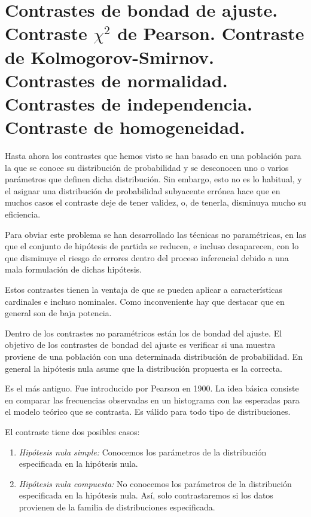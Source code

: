 \chapter[Contrastes de bondad de ajuste.]{Contrastes de bondad de ajuste. \\
\normalsize Contraste $\chi^2$ de Pearson. Contraste de Kolmogorov-Smirnov. Contrastes de normalidad. Contrastes de independencia. Contraste de homogeneidad.}

Hasta ahora los contrastes que hemos visto se han basado en una poblaci\'on para la que se conoce su distribuci\'on de probabilidad y se desconocen uno o varios par\'ametros que definen dicha distribuci\'on. Sin embargo, esto no es lo habitual, y el asignar una distribuci\'on de probabilidad subyacente err\'onea hace que en muchos casos el contraste deje de tener validez, o, de tenerla, disminuya mucho su eficiencia.

Para obviar este problema se han desarrollado las t\'ecnicas no param\'etricas, en las que el conjunto de hip\'otesis de partida se reducen, e incluso desaparecen, con lo que disminuye el riesgo de errores dentro del proceso inferencial debido a una mala formulaci\'on de dichas hip\'otesis.

Estos contrastes tienen la ventaja de que se pueden aplicar a caracter\'isticas cardinales e incluso nominales. Como inconveniente hay que destacar que en general son de baja potencia.

Dentro de los contrastes no param\'etricos est\'an los de bondad del ajuste. El objetivo de los contrastes de bondad del ajuste es verificar si una muestra proviene de una poblaci\'on con una determinada distribuci\'on de probabilidad. En general la hip\'otesis nula asume que la distribuci\'on propuesta es la correcta. 



Es el m\'as antiguo. Fue introducido por Pearson en 1900. La idea b\'asica consiste en comparar las frecuencias observadas en un histograma con las esperadas para el modelo te\'orico que se contrasta. Es v\'alido para todo tipo de distribuciones.

El contraste tiene dos posibles casos:
\begin{enumerate}
\item \textit{Hip\'otesis nula simple:} Conocemos los par\'ametros de la distribuci\'on especificada en la hip\'otesis nula.
\item \textit{Hip\'otesis nula compuesta:} No conocemos los par\'ametros de la distribuci\'on especificada en la hip\'otesis nula. As\'i, solo contrastaremos si los datos provienen de la familia de distribuciones especificada.
\end{enumerate}

